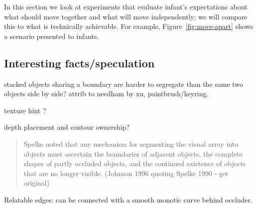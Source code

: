 In this section we look at experiments that evaluate infant's
expectations about what should move together and what will move
independently; we will compare this to what is technically achievable.
For example, Figure~\ref{fig:move-apart} shows a scenario presented to
infants.


\subsection{Interesting facts/speculation}

stacked objects sharing a boundary are harder
to segregate than the same two objects
side by side?  attrib to needham by xu,
paintbrush/keyring.

\cite{smith03motion}

texture hint \cite{johnson96perception}?

depth placement and contour ownership?

\begin{quote}

Spelke noted that any mechanism for segmenting the visual array
into objects must ascertain the boundaries of adjacent objects,
the complete shapes of partly occluded objects, and the continued
existence of objects that are no longer visible.
(Johnson 1996 quoting Spelke 1990 - get original)

\end{quote}

Relatable edges: can be connected with a smooth monotic
curve behind occluder.

\newpage

\ 

\newpage

